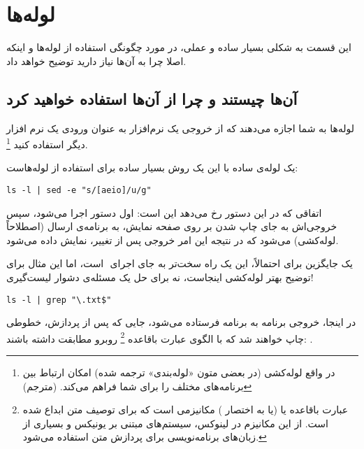 \chapter{لوله‌ها}
این قسمت به شکلی بسیار ساده و عملی، در مورد چگونگی استفاده از لوله‌ها و اینکه اصلا
چرا به آن‌ها نیاز دارید توضیح خواهد داد.

\section*{آن‌ها چیستند و چرا از آن‌ها استفاده خواهید کرد}
لوله‌ها به شما اجازه می‌دهند که از خروجی یک نرم‌افزار به عنوان ورودی یک نرم افزار
دیگر استفاده کنید‌
\footnote{
در واقع لوله‌کشی (در بعضی متون «لوله‌بندی» ترجمه شده) امکان ارتباط بین برنامه‌های
مختلف را برای شما فراهم می‌کند. (مترجم)
}.

\begin{example}{یک لوله‌ی ساده با }
این یک روش بسیار ساده برای استفاده از لوله‌هاست‌:
\begin{latin}
\begin{lstlisting}
ls -l | sed -e "s/[aeio]/u/g"
\end{lstlisting}
\end{latin}
اتفاقی که در این دستور رخ می‌دهد این است: اول دستور  اجرا می‌شود‌، سپس خروجی‌اش‌
به جای چاپ شدن‌ بر روی صفحه نمایش، به برنامه‌ی  ارسال (اصطلاحاً لوله‌کشی) می‌شود
که در نتیجه این امر خروجی پس از تغییر، نمایش داده می‌شود.
\end{example}

\begin{example}{یک جایگزین برای }
احتمالاً‌، این یک راه سخت‌تر به جای اجرای ‌ است‌، اما این مثال برای توضیح
بهتر لوله‌کشی اینجاست، نه برای حل یک مسئله‌ی دشوار لیست‌گیری‌!

\begin{latin}
\begin{lstlisting}
ls -l | grep "\.txt$"
\end{lstlisting}
\end{latin}

در اینجا‌، خروجی برنامه  به برنامه  فرستاده می‌شود، جایی که پس از پردازش،
خطوطی چاپ خواهند شد که با الگوی عبارت باقاعده
\footnote{
عبارت باقاعده یا  (یا به اختصار ) مکانیزمی است که برای توصیف
متن‌ ابداع شده است. از این مکانیزم در لینوکس، سیستم‌های مبتنی بر یونیکس و بسیاری
از زبان‌های برنامه‌نویسی برای پردازش متن استفاده می‌شود.
}
روبرو مطابقت داشته باشند‌:
.
\end{example}